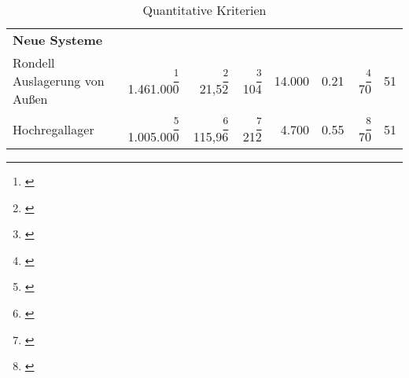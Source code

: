 \begin{landscape}
\begin{table}
\begin{tabular}{p{}rrrrrrr}
      \midrule

      \textbf{Neue Systeme}                                                                                                                                                                                                                                                                                                                                                                                       \\
      Rondell Auslagerung von Außen                      & \footnote{\cite{ltw_kosten_konstruktionen}} 1.461.000 & \footnote{\cite{ltw_kosten_konstruktionen}} 21,52     & \footnote{\cite{ltw_kosten_konstruktionen}} 104 & 14.000                                & 0.21                                       & \footnote{\cite{ltw_spielzeiten_20m_rondell}} 70 & 51                                           \\
      Hochregallager                                     & \footnote{\cite{ltw_kosten_konstruktionen}} 1.005.000 & \footnote{\cite{ltw_kosten_konstruktionen}} 115,96    & \footnote{\cite{ltw_kosten_konstruktionen}} 212 & 4.700                                 & 0.55                                       & \footnote{\cite{ltw_spielzeiten_15m}} 70         & 51                                           \\

      \bottomrule
    \end{tabular}
    \caption{Quantitative Kriterien}
    \label{tab:quantitative_kriterien}
  \end{table}
\end{landscape}

\pagestyle{plain}

\restoregeometry